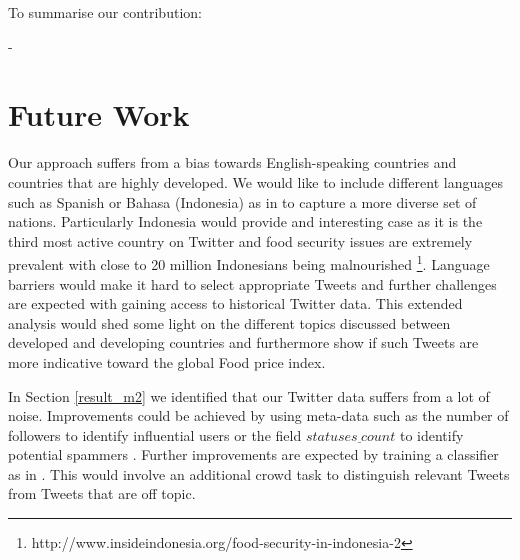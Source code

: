 To summarise our contribution: 

- 

\section{Future Work }

Our approach suffers from a bias towards English-speaking countries and countries that are highly developed. We would like to include different languages such as Spanish or Bahasa (Indonesia) as in \cite{ungp2013} to capture a more diverse set of nations. Particularly Indonesia would provide and interesting case as it is the third most active country on Twitter and food security issues are extremely prevalent with close to 20 million Indonesians being malnourished \footnote{http://www.insideindonesia.org/food-security-in-indonesia-2}. Language barriers would make it hard to select appropriate Tweets and further challenges are expected with gaining access to historical Twitter data. This extended analysis would shed some light on the different topics discussed between developed and developing countries and furthermore show if such Tweets are more indicative toward the global Food price index. 

In Section \ref{result_m2} we identified that our Twitter data suffers from a lot of noise. Improvements could be achieved by using meta-data such as the number of followers to identify influential users or the field $statuses \underline{} count$ to identify potential spammers \cite{mowbray10}. Further improvements are expected by training a classifier as in \cite{AbbarMW14}. This would involve an additional crowd task to distinguish relevant Tweets from Tweets that are off topic. 




 
